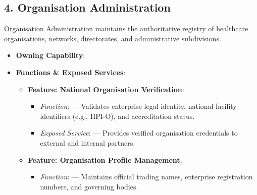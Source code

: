 \label{rad:em:112}

\par\smallskip
{}\label{rad:em:114}
\subsection*{4. Organisation Administration}
\label{rad:em:116}

Organisation Administration maintains the authoritative registry of healthcare organisations, networks, directorates, and administrative subdivisions.

\label{rad:em:118}

\begin{itemize}

\item
\textbf{Owning Capability}: \texttt{}



\item
\textbf{Functions \& Exposed Services}:


\begin{itemize}

\item
\textbf{Feature: National Organisation Verification}:


\begin{itemize}

\item
\emph{Function}: \texttt{} — Validates enterprise legal identity, national facility identifiers (e.g., HPI-O), and accreditation status.



\item
\emph{Exposed Service}: \texttt{} — Provides verified organisation credentials to external and internal partners.



\end{itemize}


\item
\textbf{Feature: Organisation Profile Management}:


\begin{itemize}

\item
\emph{Function}: \texttt{} — Maintains official trading names, enterprise registration numbers, and governing bodies.




\end{itemize}
\end{itemize}
\end{itemize}
